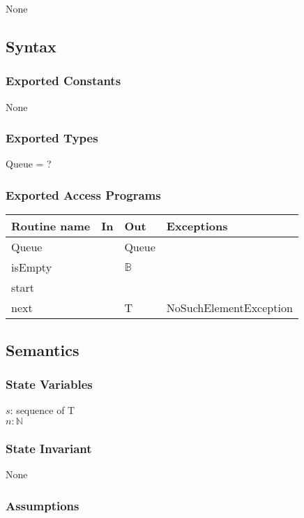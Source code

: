 \documentclass[12pt]{article}
\begin{document}
None

\subsection* {Syntax}

\subsubsection* {Exported Constants}

None

\subsubsection* {Exported Types}

Queue = ?

\subsubsection* {Exported Access Programs}

\begin{tabular}{| l | l | l | p{5cm} |}
\hline
\textbf{Routine name} & \textbf{In} & \textbf{Out} & \textbf{Exceptions}\\
\hline
Queue & ~ & Queue & ~\\
\hline
isEmpty & ~ & $\mathbb{B}$ & ~\\
\hline
start & ~ & ~ & ~\\
\hline
next & ~ & T & NoSuchElementException\\
\hline
\end{tabular}

\subsection* {Semantics}

\subsubsection* {State Variables}

$s$: sequence of T\\
$n: \mathbb{N}$

\subsubsection* {State Invariant}

None

\subsubsection* {Assumptions}
\end{document}
